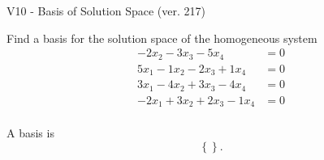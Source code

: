 \begin{exercise}
  \begin{exerciseTitle}V10 - Basis of Solution Space (ver. 217)\end{exerciseTitle}
  \begin{exerciseStatement}
    Find a basis for the solution space of the homogeneous system 
\begin{align*}
 -2 x_ 2 -3 x_ 3 -5 x_ 4 &= 0  \\ 
  5 x_ 1 -1 x_ 2 -2 x_ 3 + 1 x_ 4 &= 0  \\ 
  3 x_ 1 -4 x_ 2 + 3 x_ 3 -4 x_ 4 &= 0  \\ 
  -2 x_ 1 + 3 x_ 2 + 2 x_ 3 -1 x_ 4 &= 0  \\ 
 \end{align*}


 
  \end{exerciseStatement}

  \begin{exerciseAnswer}
   A basis is   
\[\left\{\right\}.\]

  


  \end{exerciseAnswer}
\end{exercise}